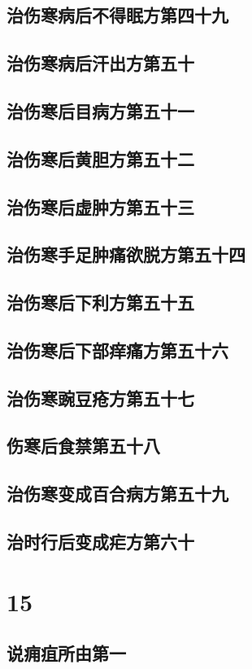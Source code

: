 \documentclass[a4paper,12pt,UTF8,twoside]{ctexbook}
\begin{document}
\chapter{治伤寒病后不得眠方第四十九}
\chapter{治伤寒病后汗出方第五十}
\chapter{治伤寒后目病方第五十一}
\chapter{治伤寒后黄胆方第五十二}
\chapter{治伤寒后虚肿方第五十三}
\chapter{治伤寒手足肿痛欲脱方第五十四}
\chapter{治伤寒后下利方第五十五}
\chapter{治伤寒后下部痒痛方第五十六}
\chapter{治伤寒豌豆疮方第五十七}
\chapter{伤寒后食禁第五十八}
\chapter{治伤寒变成百合病方第五十九}
\chapter{治时行后变成疟方第六十}

\part{15}
\chapter{说痈疽所由第一}
\end{document}
